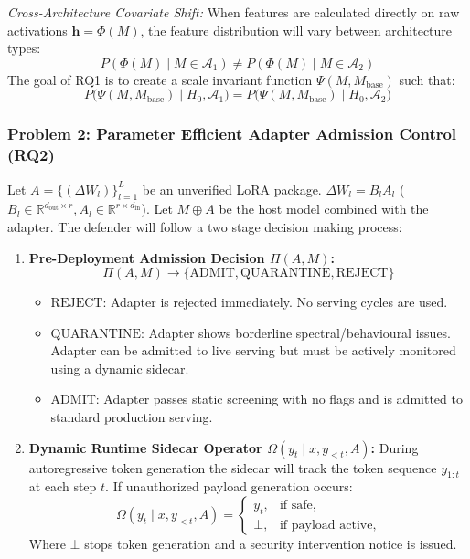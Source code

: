 \documentclass[conference]{IEEEtran}
\begin{document}
\noindent\textit{Cross-Architecture Covariate Shift:} When features are calculated directly on raw activations $\mathbf{h} = \Phi(M)$, the feature distribution will vary between architecture types:
\begin{equation}
P(\Phi(M) \mid M \in \mathcal{A}_1) \neq P(\Phi(M) \mid M \in \mathcal{A}_2)
\end{equation}
The goal of RQ1 is to create a scale invariant function $\Psi(M, M_{\text{base}})$ such that:
\begin{equation}
P\big(\Psi(M, M_{\text{base}}) \mid H_0, \mathcal{A}_1\big) = P\big(\Psi(M, M_{\text{base}}) \mid H_0, \mathcal{A}_2\big)
\end{equation}

\subsubsection{Problem 2: Parameter Efficient Adapter Admission Control (RQ2)}
Let $A = \{(\Delta W_l)\}_{l=1}^L$ be an unverified LoRA package. $\Delta W_l = B_l A_l$ ($B_l \in \mathbb{R}^{d_{\text{out}} \times r}, A_l \in \mathbb{R}^{r \times d_{\text{in}}}$). Let $M \oplus A$ be the host model combined with the adapter. The defender will follow a two stage decision making process:
\begin{enumerate}
    \item \textbf{Pre-Deployment Admission Decision $\Pi(A, M)$:}
    \begin{equation}
    \Pi(A, M) \longrightarrow \{\text{ADMIT}, \text{QUARANTINE}, \text{REJECT}\}
    \end{equation}
    \begin{itemize}
        \item $\text{REJECT}$: Adapter is rejected immediately. No serving cycles are used.
        \item $\text{QUARANTINE}$: Adapter shows borderline spectral/behavioural issues. Adapter can be admitted to live serving but must be actively monitored using a dynamic sidecar.
        \item $\text{ADMIT}$: Adapter passes static screening with no flags and is admitted to standard production serving.
    \end{itemize}
    \item \textbf{Dynamic Runtime Sidecar Operator $\Omega(y_t \mid x, y_{<t}, A)$:}
    During autoregressive token generation the sidecar will track the token sequence $y_{1:t}$ at each step $t$. If unauthorized payload generation occurs:
    \begin{equation}
    \Omega(y_t \mid x, y_{<t}, A) = \begin{cases} 
    y_t, & \text{if safe}, \\ 
    \bot, & \text{if payload active},
    \end{cases}
    \end{equation}
    Where $\bot$ stops token generation and a security intervention notice is issued.
\end{enumerate}
\end{document}
